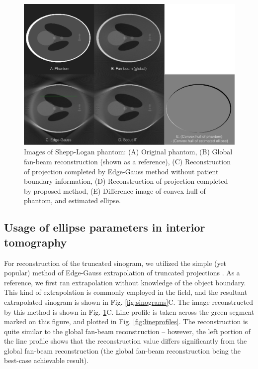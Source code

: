 \documentclass[]{spie}
\begin{document}
\begin{figure}[hbtp]
\centering
\includegraphics[width=15 cm]{figures/figuresScoutIT-recons}
\caption{Images of Shepp-Logan phantom: (A) Original phantom, (B) Global fan-beam reconstruction (shown as a reference), (C) Reconstruction of projection completed by Edge-Gauss method without patient boundary information, (D) Reconstruction of projection completed by proposed method, (E) Difference image of convex hull of phantom, and estimated ellipse. \label{fig:recon-images}}
\end{figure}

\subsection{Usage of ellipse parameters in interior tomography}

For reconstruction of the truncated sinogram, we utilized the simple (yet popular) method of Edge-Gauss extrapolation of truncated projections \cite{Hoppe2008}. As a reference, we first ran extrapolation without knowledge of the object boundary. This kind of extrapolation is commonly employed in the field, and the resultant extrapolated sinogram is shown in Fig. \ref{fig:sinograms}C. The image reconstructed by this method is shown in Fig. \ref{fig:recon-images}C. Line profile is taken across the green segment marked on this figure, and plotted in Fig. \ref{fig:lineprofiles}. The reconstruction is quite similar to the global fan-beam reconstruction -- however, the left portion of the line profile shows that the reconstruction value differs significantly from the global fan-beam reconstruction (the global fan-beam reconstruction being the best-case achievable result). 
\end{document}
